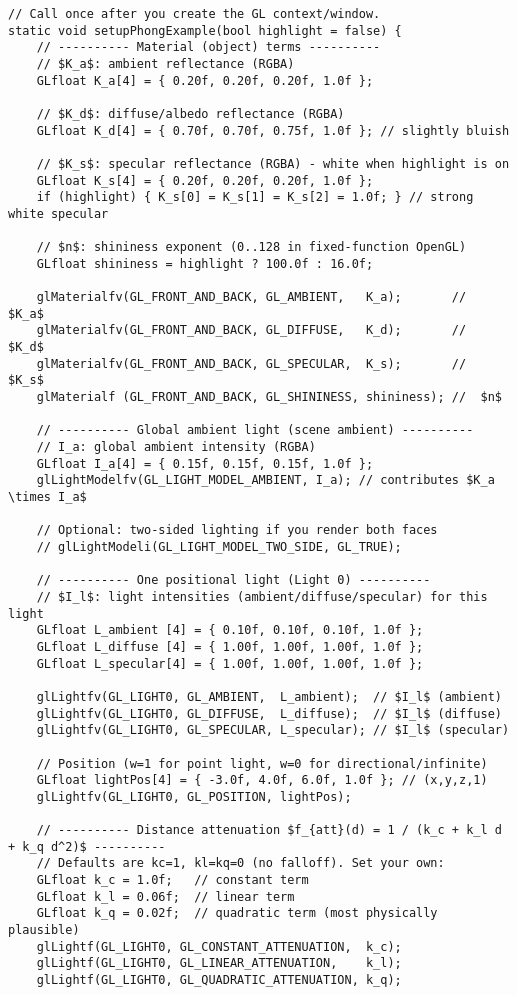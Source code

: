 \documentclass[8pt,twocolumn]{extarticle}
\begin{document}
\begin{lstlisting}[mathescape=true]
// Call once after you create the GL context/window.
static void setupPhongExample(bool highlight = false) {
    // ---------- Material (object) terms ----------
    // $K_a$: ambient reflectance (RGBA)
    GLfloat K_a[4] = { 0.20f, 0.20f, 0.20f, 1.0f };

    // $K_d$: diffuse/albedo reflectance (RGBA)
    GLfloat K_d[4] = { 0.70f, 0.70f, 0.75f, 1.0f }; // slightly bluish

    // $K_s$: specular reflectance (RGBA) - white when highlight is on
    GLfloat K_s[4] = { 0.20f, 0.20f, 0.20f, 1.0f };
    if (highlight) { K_s[0] = K_s[1] = K_s[2] = 1.0f; } // strong white specular

    // $n$: shininess exponent (0..128 in fixed-function OpenGL)
    GLfloat shininess = highlight ? 100.0f : 16.0f;

    glMaterialfv(GL_FRONT_AND_BACK, GL_AMBIENT,   K_a);       //  $K_a$
    glMaterialfv(GL_FRONT_AND_BACK, GL_DIFFUSE,   K_d);       //  $K_d$
    glMaterialfv(GL_FRONT_AND_BACK, GL_SPECULAR,  K_s);       //  $K_s$
    glMaterialf (GL_FRONT_AND_BACK, GL_SHININESS, shininess); //  $n$

    // ---------- Global ambient light (scene ambient) ----------
    // I_a: global ambient intensity (RGBA)
    GLfloat I_a[4] = { 0.15f, 0.15f, 0.15f, 1.0f };
    glLightModelfv(GL_LIGHT_MODEL_AMBIENT, I_a); // contributes $K_a \times I_a$

    // Optional: two-sided lighting if you render both faces
    // glLightModeli(GL_LIGHT_MODEL_TWO_SIDE, GL_TRUE);

    // ---------- One positional light (Light 0) ----------
    // $I_l$: light intensities (ambient/diffuse/specular) for this light
    GLfloat L_ambient [4] = { 0.10f, 0.10f, 0.10f, 1.0f };
    GLfloat L_diffuse [4] = { 1.00f, 1.00f, 1.00f, 1.0f };
    GLfloat L_specular[4] = { 1.00f, 1.00f, 1.00f, 1.0f };

    glLightfv(GL_LIGHT0, GL_AMBIENT,  L_ambient);  // $I_l$ (ambient)
    glLightfv(GL_LIGHT0, GL_DIFFUSE,  L_diffuse);  // $I_l$ (diffuse)
    glLightfv(GL_LIGHT0, GL_SPECULAR, L_specular); // $I_l$ (specular)

    // Position (w=1 for point light, w=0 for directional/infinite)
    GLfloat lightPos[4] = { -3.0f, 4.0f, 6.0f, 1.0f }; // (x,y,z,1)
    glLightfv(GL_LIGHT0, GL_POSITION, lightPos);

    // ---------- Distance attenuation $f_{att}(d) = 1 / (k_c + k_l d + k_q d^2)$ ----------
    // Defaults are kc=1, kl=kq=0 (no falloff). Set your own:
    GLfloat k_c = 1.0f;   // constant term
    GLfloat k_l = 0.06f;  // linear term
    GLfloat k_q = 0.02f;  // quadratic term (most physically plausible)
    glLightf(GL_LIGHT0, GL_CONSTANT_ATTENUATION,  k_c);
    glLightf(GL_LIGHT0, GL_LINEAR_ATTENUATION,    k_l);
    glLightf(GL_LIGHT0, GL_QUADRATIC_ATTENUATION, k_q);


\end{lstlisting}
\end{document}
